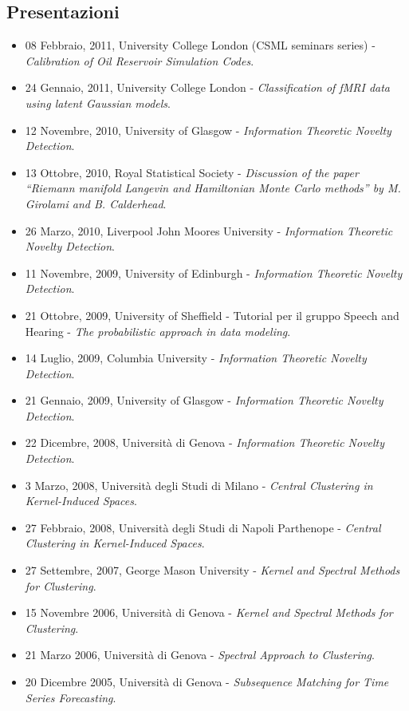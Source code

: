 \documentclass[a4paper,10pt]{article}
\begin{document}
\subsection*{Presentazioni}
\begin{itemize}
\item 08 Febbraio, 2011, University College London (CSML seminars series) - \emph{Calibration of Oil Reservoir Simulation Codes}.
\item 24 Gennaio, 2011, University College London - \emph{Classification of fMRI data using latent Gaussian models}.
\item 12 Novembre, 2010, University of Glasgow - \emph{Information Theoretic Novelty Detection}.
\item 13 Ottobre, 2010, Royal Statistical Society - \emph{Discussion of the paper ``Riemann manifold Langevin and Hamiltonian Monte Carlo methods'' by M. Girolami and B. Calderhead}.
\item 26 Marzo, 2010, Liverpool John Moores University - \emph{Information Theoretic Novelty Detection}.
\item 11 Novembre, 2009, University of Edinburgh - \emph{Information Theoretic Novelty Detection}.
\item 21 Ottobre, 2009, University of Sheffield - Tutorial per il gruppo Speech and Hearing - \emph{The probabilistic approach in data modeling}.
\item 14 Luglio, 2009, Columbia University - \emph{Information Theoretic Novelty Detection}.
\item 21 Gennaio, 2009, University of Glasgow - \emph{Information Theoretic Novelty Detection}.
\item 22 Dicembre, 2008, Universit\`a di Genova - \emph{Information Theoretic Novelty Detection}.
\item 3 Marzo, 2008, Universit\`a degli Studi di Milano - \emph{Central Clustering in Kernel-Induced Spaces}.
\item 27 Febbraio, 2008, Universit\`a degli Studi di Napoli Parthenope - \emph{Central Clustering in Kernel-Induced Spaces}.
\item 27 Settembre, 2007, George Mason University - \emph{Kernel and Spectral Methods for Clustering}.
\item 15 Novembre 2006, Universit\`a di Genova - \emph{Kernel and Spectral Methods for Clustering}.
\item 21 Marzo 2006, Universit\`a di Genova - \emph{Spectral Approach to Clustering}.
\item 20 Dicembre 2005, Universit\`a di Genova - \emph{Subsequence Matching for Time Series Forecasting}.
\end{itemize}
\end{document}
